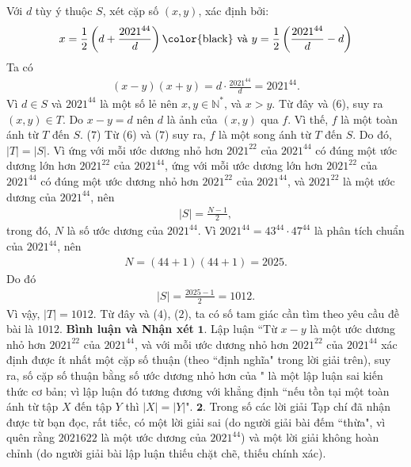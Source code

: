 \begin{multicols}{2}
	\vskip 0.05cm
	Với $d$ tùy ý thuộc $S$, xét cặp số $(x, y)$, xác định bởi:
	\begin{align*}
		x = \frac{1}{2}\left( {d + \frac{{{{2021}^{44}}}}{d}} \right) \text{\color{black} và } y = \frac{1}{2}\left( {\frac{{{{2021}^{44}}}}{d} - d} \right)
	\end{align*}
	Ta có
	\begin{align*}
		\left( {x - y} \right)\left( {x + y} \right) = d \cdot \frac{{{{2021}^{44}}}}{d} = {2021^{44}}. \tag{$6$}
	\end{align*}
	Vì $d \in S$ và $2021^{44}$  là một số lẻ nên $x, y \in \mathbb{N^*}$,  và $x > y$. Từ đây và ($6$), suy ra $(x, y) \in T$.
	\vskip 0.05cm
	Do $x - y = d$ nên $d$ là ảnh của $(x, y)$ qua  $f$. Vì thế,  $f$ là một toàn ánh từ $T$ đến $S$. \hfill ($7$)
	\vskip 0.05cm
	Từ ($6$) và ($7$) suy ra,  $f$ là một song ánh từ $T$ đến $S$. Do đó, $|T| = |S|$.
	\vskip 0.05cm 
	Vì ứng với mỗi ước dương nhỏ hơn $2021^{22}$  của $2021^{44}$  có đúng một ước dương lớn hơn $2021^{22}$  của  $2021^{44}$, ứng với mỗi ước dương lớn hơn $2021^{22}$   của  $2021^{44}$ có đúng một ước dương nhỏ hơn $2021^{22}$  của  $2021^{44}$, và $2021^{22}$  là một ước dương của  $2021^{44}$, nên
	\begin{align*}
		|S| = \frac{{N - 1}}{2},
	\end{align*}
	trong đó, $N$ là số ước dương của $2021^{44}$.
	\vskip 0.05cm
	Vì ${2021^{44}} = {43^{44}} \cdot {47^{44}}$ là phân tích chuẩn của $2021^{44}$, nên
	\begin{align*}
		N = \left( {44 + 1} \right)\left( {44 + 1} \right) = 2025.
	\end{align*}
	Do đó
	\begin{align*}
		|S| = \frac{{2025 - 1}}{2} = 1012.
	\end{align*}
	Vì vậy,  $|T| = 1012$. Từ đây và ($4$), ($2$), ta có số tam giác cần tìm theo yêu cầu đề bài là $1012$.
	\vskip 0.05cm
	\textbf{Bình luận và Nhận xét}
	\vskip 0.05cm
	$\pmb{1.}$ Lập luận ``Từ $x - y$ là một ước dương nhỏ hơn $2021^{22}$  của  $2021^{44}$, và với mỗi ước dương nhỏ hơn $2021^{22}$  của $2021^{44}$  xác định được ít nhất một cặp số thuận (theo ``định nghĩa" trong lời giải trên), suy ra, số cặp số thuận bằng số ước dương nhỏ hơn   của  " là một lập luận sai kiến thức cơ bản; vì lập luận đó tương đương với khẳng định ``nếu tồn tại một toàn ánh từ tập $X$ đến tập $Y$ thì  $|X| = |Y|$".
	\vskip 0.05cm
	$\pmb{2.}$ Trong số các lời giải Tạp chí đã nhận được từ bạn đọc, rất tiếc, có một lời giải sai (do người giải bài đếm ``thừa", vì quên rằng $20216{22}$  là một ước dương của  $2021^{44}$) và một lời giải không hoàn chỉnh (do người giải bài lập luận thiếu chặt chẽ, thiếu chính xác).

\end{multicols}
